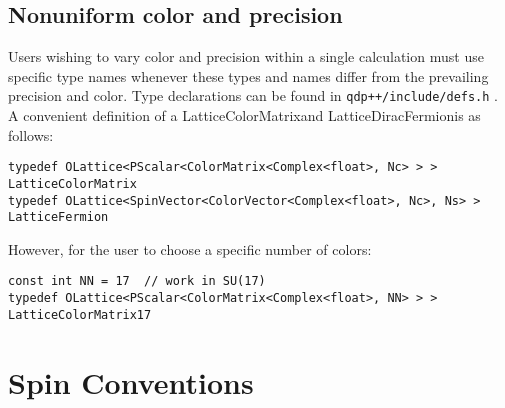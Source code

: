 \documentclass[12pt,letterpaper]{article}
\newcommand{\tLatticeColorMatrix}{LatticeColorMatrix}
\newcommand{\tLatticeDiracFermion}{LatticeDiracFermion}
\begin{document}
\subsection{Nonuniform color and precision}

Users wishing to vary color and precision within a single calculation
must use specific type names whenever these types
and names differ from the prevailing precision and color. 
Type declarations can be found in {\tt qdp++/include/defs.h} . A convenient
definition of a \tLatticeColorMatrix and \tLatticeDiracFermion is as follows:

\begin{verbatim}
typedef OLattice<PScalar<ColorMatrix<Complex<float>, Nc> > > LatticeColorMatrix
typedef OLattice<SpinVector<ColorVector<Complex<float>, Nc>, Ns> > LatticeFermion
\end{verbatim}

However, for the user to choose a specific number of colors:

\begin{verbatim}
const int NN = 17  // work in SU(17)
typedef OLattice<PScalar<ColorMatrix<Complex<float>, NN> > > LatticeColorMatrix17
\end{verbatim}


\newpage

\section{Spin Conventions}
\label{sec:spin}
\end{document}
